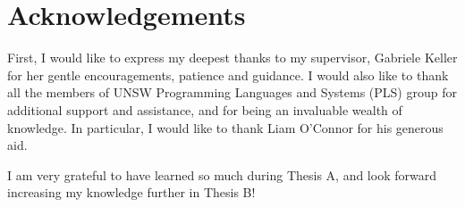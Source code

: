 \chapter*{Acknowledgements}\label{ack}

First, I would like to express my deepest thanks to my supervisor, Gabriele Keller for her gentle encouragements, patience and guidance. I would also like to thank all the members of UNSW Programming Languages and Systems (PLS) group for additional support and assistance, and for being an invaluable wealth of knowledge. In particular, I would like to thank Liam O'Connor for his generous aid. 

I am very grateful to have learned so much during Thesis A, and look forward increasing my knowledge further in Thesis B!
